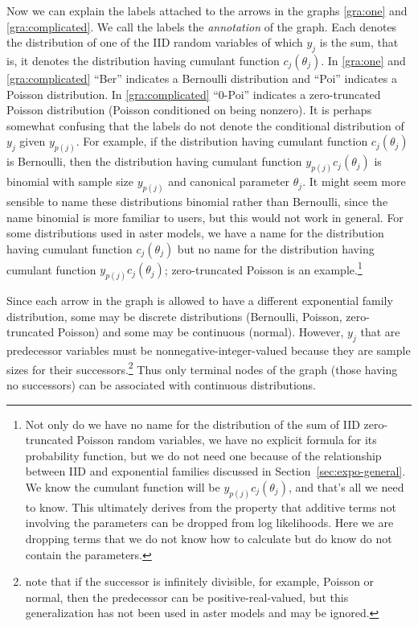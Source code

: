 \documentclass[11pt]{article}
\begin{document}
Now we can explain the labels attached to the arrows in the graphs
\eqref{gra:one} and \eqref{gra:complicated}.  We call the labels
the \emph{annotation} of the graph.
Each denotes the distribution of one
of the IID random variables of which $y_j$ is the sum, that is,
it denotes the distribution
having cumulant function $c_j(\theta_j)$.
In \eqref{gra:one} and \eqref{gra:complicated}
``Ber'' indicates a Bernoulli distribution
and ``Poi'' indicates a Poisson distribution.
In \eqref{gra:complicated} ``0-Poi'' indicates a zero-truncated Poisson
distribution (Poisson conditioned on being nonzero).
It is perhaps somewhat
confusing that the labels do not denote the conditional distribution of $y_j$
given $y_{p(j)}$.  For example, if the distribution having cumulant function
$c_j(\theta_j)$ is Bernoulli, then the distribution having
cumulant function $y_{p(j)} c_j(\theta_j)$ is binomial with sample size
$y_{p(j)}$ and canonical parameter $\theta_j$.  It might seem more sensible
to name these distributions binomial rather than Bernoulli, since the name
binomial is more familiar to users, but this would not work in general.
For some distributions used in aster models, we have a name for
the distribution having cumulant function $c_j(\theta_j)$ but no name
for the distribution having cumulant function $y_{p(j)} c_j(\theta_j)$;
zero-truncated Poisson is an example.\footnote{Not only do we have no name
for the distribution of the sum of IID zero-truncated Poisson random variables,
we have no explicit formula for its probability function, but we do not need
one because of the relationship between IID and exponential families discussed
in Section~\ref{sec:expo-general}.  We know the cumulant function will be
$y_{p(j)} c_j(\theta_j)$, and that's all we need to know.  This ultimately
derives from the property that additive terms not involving the parameters can
be dropped from log likelihoods.  Here we are dropping terms that we do not
know how to calculate but do know do not contain the parameters.}

Since each arrow in the graph is allowed to have a different exponential
family distribution, some may be discrete distributions (Bernoulli, Poisson,
zero-truncated Poisson) and some may be continuous (normal).  However,
$y_j$ that are predecessor variables must be nonnegative-integer-valued
because they are sample sizes for their successors.\footnote{\citet{aster1}
note that if the successor is infinitely divisible, for example, Poisson
or normal, then the predecessor can be positive-real-valued, but this
generalization has not been used in aster models
and may be ignored.\label{foot:infinitely-divisible}}
Thus only terminal nodes of the graph (those having no successors)
can be associated with continuous distributions.
\end{document}
